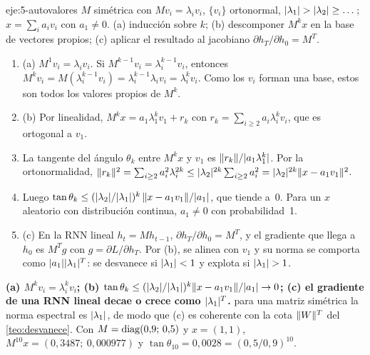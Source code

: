 \begin{solucion}{eje:5-autovalores}
\datos $M$ simétrica con $Mv_i=\lambda_i v_i$, $\{v_i\}$ ortonormal, $\lvert\lambda_1\rvert>\lvert\lambda_2\rvert\ge\dots$; $x=\sum_i a_i v_i$ con $a_1\neq 0$.
\planteamiento (a) inducción sobre $k$; (b) descomponer $M^{k}x$ en la base de vectores propios; (c) aplicar el resultado al jacobiano $\partial h_T/\partial h_0=M^{T}$.
\pasos
\begin{enumerate}[label=\arabic*.]
  \item (a) $M^{1}v_i=\lambda_i v_i$. Si $M^{k-1}v_i=\lambda_i^{k-1}v_i$, entonces $M^{k}v_i=M(\lambda_i^{k-1}v_i)=\lambda_i^{k-1}\lambda_i v_i=\lambda_i^{k}v_i$. Como los $v_i$ forman una base, estos son todos los valores propios de $M^{k}$.
  \item (b) Por linealidad, $M^{k}x=a_1\lambda_1^{k}v_1+r_k$ con $r_k=\sum_{i\ge 2}a_i\lambda_i^{k}v_i$, que es ortogonal a $v_1$.
  \item La tangente del ángulo $\theta_k$ entre $M^{k}x$ y $v_1$ es $\lVert r_k\rVert/\lvert a_1\lambda_1^{k}\rvert$. Por la ortonormalidad, $\lVert r_k\rVert^{2}=\sum_{i\ge 2}a_i^{2}\lambda_i^{2k}\le\lvert\lambda_2\rvert^{2k}\sum_{i\ge 2}a_i^{2}=\lvert\lambda_2\rvert^{2k}\lVert x-a_1v_1\rVert^{2}$.
  \item Luego $\tan\theta_k\le(\lvert\lambda_2\rvert/\lvert\lambda_1\rvert)^{k}\,\lVert x-a_1v_1\rVert/\lvert a_1\rvert$, que tiende a~0. Para un $x$ aleatorio con distribución continua, $a_1\neq 0$ con probabilidad~1.
  \item (c) En la RNN lineal $h_t=Mh_{t-1}$, $\partial h_T/\partial h_0=M^{T}$, y el gradiente que llega a $h_0$ es $M^{T}g$ con $g=\partial L/\partial h_T$. Por (b), se alinea con $v_1$ y su norma se comporta como $\lvert a_1\rvert\lvert\lambda_1\rvert^{T}$: se desvanece si $\lvert\lambda_1\rvert<1$ y explota si $\lvert\lambda_1\rvert>1$.
\end{enumerate}
\resultado \textbf{(a) $M^{k}v_i=\lambda_i^{k}v_i$; (b) $\tan\theta_k\le(\lvert\lambda_2\rvert/\lvert\lambda_1\rvert)^{k}\lVert x-a_1v_1\rVert/\lvert a_1\rvert\to 0$; (c) el gradiente de una RNN lineal decae o crece como $\lvert\lambda_1\rvert^{T}$.}
\comprobacion para una matriz simétrica la norma espectral es $\lvert\lambda_1\rvert$, de modo que (c) es coherente con la cota $\lVert W\rVert^{T}$ del \cref{teo:desvanece}. Con $M=\operatorname{diag}(0{,}9;\,0{,}5)$ y $x=(1,1)$, $M^{10}x=(0{,}3487;\ 0{,}000977)$ y $\tan\theta_{10}=0{,}0028=(0{,}5/0{,}9)^{10}$.
\end{solucion}
